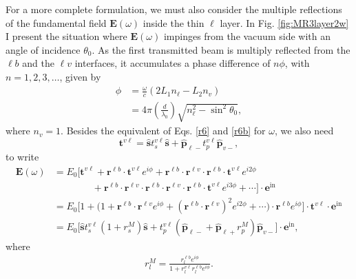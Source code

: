 For a more complete formulation, we must also consider the multiple reflections
of the fundamental field $\mathbf{E}(\omega)$ inside the thin $\ell$ layer. In
Fig. \ref{fig:MR3layer2w} I present the situation where $\mathbf{E}(\omega)$
impinges from the vacuum side with an angle of incidence $\theta_{0}$. As the
first transmitted beam is multiply reflected from the $\ell b$ and the $\ell v$
interfaces, it accumulates a phase difference of $n\phi$, with $n=1,2,3,\ldots$,
given by
\begin{equation}\label{mphi}
\begin{split}
\phi &= \frac{\omega}{c}(2L_{1}n_{\ell} - L_{2}n_{v})\nonumber\\
&= 4\pi\left(\frac{d}{\lambda_{0}}\right)\sqrt{n^{2}_\ell-\sin^{2}\theta_{0}},
\end{split}
\end{equation}
where $n_{v}=1$. Besides the equivalent of Eqs. \eqref{r6} and \eqref{r6b} for
$\omega$, we also need
\begin{equation}\label{mvv}
\mathbf{t}^{v\ell}
= \hat{\mathbf{s}}t_{s}^{v\ell}\hat{\mathbf{s}} 
+ \hat{\mathbf{p}}_{\ell -}t_{p}^{v\ell}\hat{\mathbf{p}}_{v-},
\end{equation}
to write
\begin{align}\label{mcvew}
\mathbf{E}(\omega)
&= E_{0}
\Big[
\mathbf{t}^{v\ell} + \mathbf{r}^{\ell b}\cdot\mathbf{t}^{v\ell}e^{i\phi}
 + \mathbf{r}^{\ell b}\cdot\mathbf{r}^{\ell v}\cdot
   \mathbf{r}^{\ell b}\cdot\mathbf{t}^{v\ell} e^{i2\phi}\nonumber\\
&\qquad\qquad+ \mathbf{r}^{\ell b}\cdot\mathbf{r}^{\ell v}\cdot
   \mathbf{r}^{\ell b}\cdot\mathbf{r}^{\ell v}\cdot
   \mathbf{r}^{\ell b}\cdot\mathbf{t}^{v\ell} e^{i3\phi}
 + \cdots
\Big]\cdot\mathbf{e}^{\mathrm{in}}\nonumber\\
&= E_{0}
\Big[
1 + \Big(1 + \mathbf{r}^{\ell b}\cdot\mathbf{r}^{\ell v}e^{i\phi}
+ (\mathbf{r}^{\ell b}\cdot\mathbf{r}^{\ell v})^2e^{i2\phi}+\cdots\Big)\cdot
\mathbf{r}^{\ell b}e^{i\phi}
\Big]
\cdot\mathbf{t}^{v\ell}\cdot\mathbf{e}^{\mathrm{in}}\nonumber\\
&= E_{0}
\Big[
\hat{\mathbf{s}} t^{v\ell}_{s}(1+r^{M}_{s})\hat{\mathbf{s}} 
+ t^{v\ell}_{p}
\left(\hat{\mathbf{p}}_{\ell-}+\hat{\mathbf{p}}_{\ell+}r^{M}_{p}\right)
\hat{\mathbf{p}}_{v-}
\Big]\cdot\mathbf{e}^{\mathrm{in}},
\end{align}
where
\begin{align}\label{mvrm}
r^{M}_{l} =
\frac{r^{\ell b}_{l}e^{i\phi}}
     {1+r^{v\ell}_{l}r^{\ell b}_{l}e^{i\phi}}.
\end{align}
